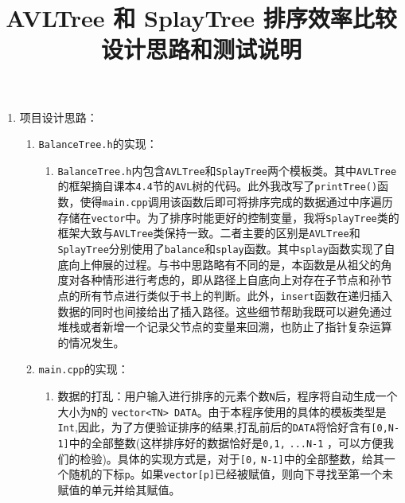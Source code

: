 \documentclass[a4paper,12pt]{article}
\begin{document}
\title{\hei AVLTree 和 SplayTree 排序效率比较设计思路和测试说明}


\maketitle


\begin{enumerate}
\item 项目设计思路：
\begin{enumerate}
    \item \verb|BalanceTree.h|的实现：
    \begin{enumerate}
        \item \verb|BalanceTree.h|内包含\verb|AVLTree|和\verb|SplayTree|两个模板类。其中\verb|AVLTree|的框架摘自课本\verb|4.4|节的\verb|AVL|树的代码。此外我改写了\verb|printTree()|函数，使得\verb|main.cpp|调用该函数后即可将排序完成的数据通过中序遍历存储在\verb|vector|中。{\hei 为了排序时能更好的控制变量}，我将\verb|SplayTree|类的框架大致与\verb|AVLTree|类保持一致。二者主要的区别是\verb|AVLTree|和\verb|SplayTree|分别使用了\verb|balance|和\verb|splay|函数。其中\verb|splay|函数实现了自底向上伸展的过程。与书中思路略有不同的是，本函数是从祖父的角度对各种情形进行考虑的，即从路径上自底向上对存在子节点和孙节点的所有节点进行类似于书上的判断。此外，\verb|insert|函数在递归插入数据的同时也间接给出了插入路径。这些细节帮助我既可以避免通过堆栈或者新增一个记录父节点的变量来回溯，也防止了指针复杂运算的情况发生。
    \end{enumerate}
    \item \verb|main.cpp|的实现：
    \begin{enumerate}
        \item {\hei 数据的打乱}：用户输入进行排序的元素个数\verb|N|后，程序将自动生成一个大小为\verb|N|的 \verb|vector<TN> DATA|。由于本程序使用的具体的模板类型是\verb|Int|,因此，为了方便验证排序的结果,打乱前后的\verb|DATA|将恰好含有\verb|[0,N-1]|中的全部整数(这样排序好的数据恰好是\verb|0,1,|
        \verb|...N-1|
        ，{\hei 可以方便我们的检验})。具体的实现方式是，对于\verb|[0,|
        \verb|N-1]|中的全部整数，给其一个随机的下标\verb|p|。如果\verb|vector[p]|已经被赋值，则向下寻找至第一个未赋值的单元并给其赋值。

\end{enumerate}
\end{enumerate}
\end{enumerate}
\end{document}
